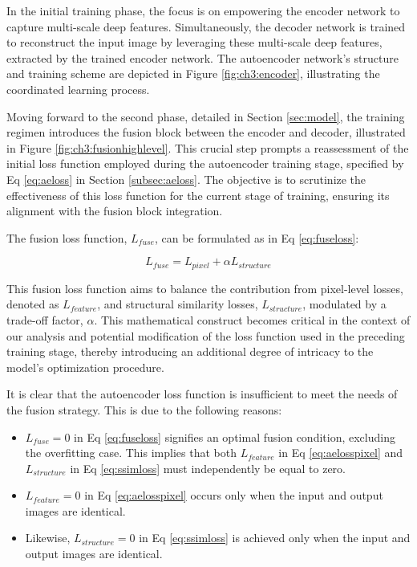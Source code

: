 In the initial training phase, the focus is on empowering the encoder network to capture multi-scale deep features. Simultaneously, the decoder network is trained to reconstruct the input image by leveraging these multi-scale deep features, extracted by the trained encoder network. The autoencoder network's structure and training scheme are depicted in Figure \ref{fig:ch3:encoder}, illustrating the coordinated learning process.

Moving forward to the second phase, detailed in Section \ref{sec:model}, the training regimen introduces the fusion block between the encoder and decoder, illustrated in Figure \ref{fig:ch3:fusionhighlevel}. This crucial step prompts a reassessment of the initial loss function employed during the autoencoder training stage, specified by Eq \ref{eq:aeloss} in Section \ref{subsec:aeloss}. The objective is to scrutinize the effectiveness of this loss function for the current stage of training, ensuring its alignment with the fusion block integration.

The fusion loss function, $L_{fuse}$, can be formulated as in Eq \ref{eq:fuseloss}:

\begin{equation}\label{eq:fuseloss}
    L_{fuse} = L_{pixel} + \alpha  L_{structure}
\end{equation}

This fusion loss function aims to balance the contribution from pixel-level losses, denoted as $L_{feature}$, and structural similarity losses, $L_{structure}$, modulated by a trade-off factor, $\alpha$. This mathematical construct becomes critical in the context of our analysis and potential modification of the loss function used in the preceding training stage, thereby introducing an additional degree of intricacy to the model's optimization procedure.

It is clear that the autoencoder loss function is insufficient to meet the needs of the fusion strategy. This is due to the following reasons:

\begin{itemize}
    \item $L_{fuse} = 0$ in Eq \ref{eq:fuseloss} signifies an optimal fusion condition, excluding the overfitting case. This implies that both $L_{feature}$ in Eq \ref{eq:aelosspixel} and $L_{structure}$ in Eq \ref{eq:ssimloss} must independently be equal to zero.
    \item $L_{feature} = 0$ in Eq \ref{eq:aelosspixel} occurs only when the input and output images are identical.
    \item Likewise, $L_{structure} = 0$ in Eq \ref{eq:ssimloss} is achieved only when the input and output images are identical.
\end{itemize}

